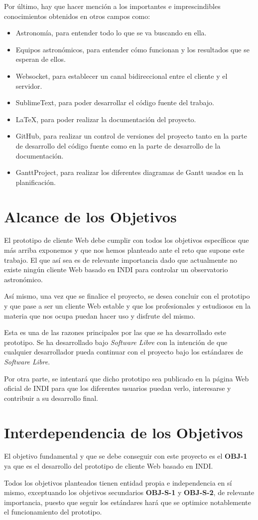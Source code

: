 Por último, hay que hacer mención a los importantes e imprescindibles conocimientos obtenidos en otros campos como:
\begin{itemize}
  \item Astronomía, para entender todo lo que se va buscando en ella.
  \item Equipos astronómicos, para entender cómo funcionan y los resultados que se esperan de ellos.
  \item Websocket, para establecer un canal bidireccional entre el cliente y el servidor.
  \item SublimeText, para poder desarrollar el código fuente del trabajo.
  \item LaTeX, para poder realizar la documentación del proyecto.
  \item GitHub, para realizar un control de versiones del proyecto tanto en la parte de desarrollo del código fuente como en la parte de desarrollo de la documentación.
  \item GanttProject, para realizar los diferentes diagramas de Gantt \cite{DiagramaGantt} usados en la planificación.
\end{itemize}


\section{Alcance de los Objetivos}
El prototipo de cliente Web debe cumplir con todos los objetivos específicos que más arriba exponemos y que nos hemos planteado ante el reto que supone este trabajo. El que así sea es de relevante importancia dado que actualmente no existe ningún cliente Web basado en INDI para controlar un observatorio astronómico.

Así mismo, una vez que se finalice el proyecto, se desea concluir con el prototipo y que pase a ser un cliente Web estable y que los profesionales y estudiosos en la materia que nos ocupa puedan hacer uso y disfrute del mismo.

Esta es una de las razones principales por las que se ha desarrollado este prototipo. Se ha desarrollado bajo \textit{Software Libre} con la intención de que cualquier desarrollador pueda continuar con el proyecto bajo los estándares de \textit{Software Libre}.

Por otra parte, se intentará que dicho prototipo sea publicado en la página Web oficial de INDI para que los diferentes usuarios puedan verlo, interesarse y contribuir a su desarrollo final.


\section{Interdependencia de los Objetivos}
El objetivo fundamental y que se debe conseguir con este proyecto es el \textbf{OBJ-1} ya que es el desarrollo del prototipo de cliente Web basado en INDI.

Todos los objetivos planteados tienen entidad propia e independencia en sí mismo, exceptuando los objetivos secundarios \textbf{OBJ-S-1} y \textbf{OBJ-S-2}, de relevante importancia, puesto que seguir los estándares hará que se optimice notablemente el funcionamiento del prototipo.

